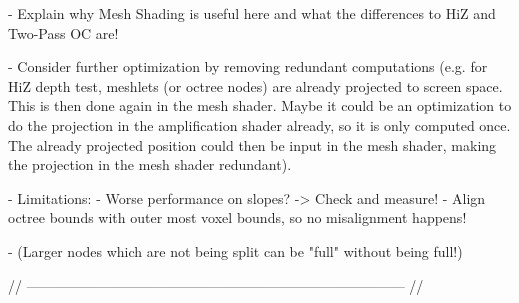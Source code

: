 - Explain why Mesh Shading is useful here and what the differences to HiZ and Two-Pass OC are!

- Consider further optimization by removing redundant computations (e.g. for HiZ depth test, meshlets (or octree nodes)
are already projected to screen space. This is then done again in the mesh shader. Maybe it could be an optimization 
to do the projection in the amplification shader already, so it is only computed once. The already projected position 
could then be input in the mesh shader, making the projection in the mesh shader redundant).

- Limitations: 
    - Worse performance on slopes? -> Check and measure!
    - Align octree bounds with outer most voxel bounds, so no misalignment happens!

    - (Larger nodes which are not being split can be "full" without being full!)

// --------------------------------------------------------------------------------- //
